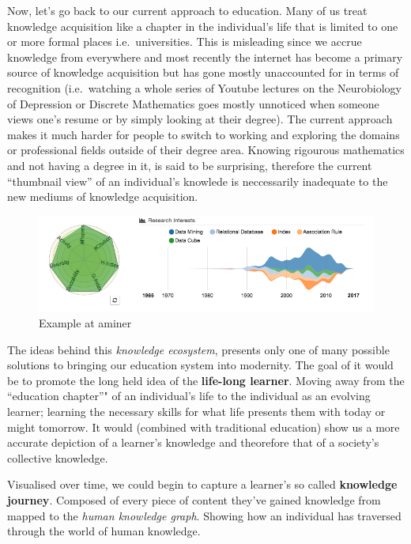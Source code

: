 \documentclass[]{book}
\theoremstyle{definition}
\theoremstyle{definition}
\theoremstyle{definition}
\theoremstyle{remark}
\begin{document}
Now, let's go back to our current approach to education. Many of us
treat knowledge acquisition like a chapter in the individual's life that
is limited to one or more formal places i.e.~universities. This is
misleading since we accrue knowledge from everywhere and most recently
the internet has become a primary source of knowledge acquisition but
has gone mostly unaccounted for in terms of recognition (i.e.~watching a
whole series of Youtube lectures on the Neurobiology of Depression or
Discrete Mathematics goes mostly unnoticed when someone views one's
resume or by simply looking at their degree). The current approach makes
it much harder for people to switch to working and exploring the domains
or professional fields outside of their degree area. Knowing rigourous
mathematics and not having a degree in it, is said to be surprising,
therefore the current ``thumbnail view'' of an individual's knowlede is
neccessarily inadequate to the new mediums of knowledge acquisition.

\begin{figure}
\centering
\includegraphics{img/aminer.png}
\caption{Example at aminer}
\end{figure}

The ideas behind this \emph{knowledge ecosystem}, presents only one of
many possible solutions to bringing our education system into modernity.
The goal of it would be to promote the long held idea of the
\textbf{life-long learner}. Moving away from the ``education chapter''"
of an individual's life to the individual as an evolving learner;
learning the necessary skills for what life presents them with today or
might tomorrow. It would (combined with traditional education) show us a
more accurate depiction of a learner's knowledge and theorefore that of
a society's collective knowledge.

Visualised over time, we could begin to capture a learner's so called
\textbf{knowledge journey}. Composed of every piece of content they've
gained knowledge from mapped to the \emph{human knowledge graph}.
Showing how an individual has traversed through the world of human
knowledge.
\end{document}

